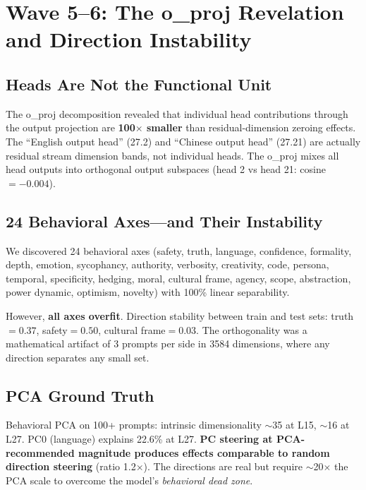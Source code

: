 \documentclass[11pt,a4paper]{article}
\begin{document}
\section{Wave 5--6: The o\_proj Revelation and Direction Instability}
\label{sec:oproj}

\subsection{Heads Are Not the Functional Unit}
The o\_proj decomposition revealed that individual head contributions through the output projection are \textbf{100$\times$ smaller} than residual-dimension zeroing effects. The ``English output head'' (27.2) and ``Chinese output head'' (27.21) are actually residual stream dimension bands, not individual heads. The o\_proj mixes all head outputs into orthogonal output subspaces (head 2 vs head 21: cosine $= -0.004$).

\subsection{24 Behavioral Axes---and Their Instability}
We discovered 24 behavioral axes (safety, truth, language, confidence, formality, depth, emotion, sycophancy, authority, verbosity, creativity, code, persona, temporal, specificity, hedging, moral, cultural frame, agency, scope, abstraction, power dynamic, optimism, novelty) with 100\% linear separability.

However, \textbf{all axes overfit}. Direction stability between train and test sets: truth$=0.37$, safety$=0.50$, cultural frame$=0.03$. The orthogonality was a mathematical artifact of 3 prompts per side in 3584 dimensions, where any direction separates any small set.

\subsection{PCA Ground Truth}
Behavioral PCA on 100+ prompts: intrinsic dimensionality $\sim$35 at L15, $\sim$16 at L27. PC0 (language) explains 22.6\% at L27. \textbf{PC steering at PCA-recommended magnitude produces effects comparable to random direction steering} (ratio 1.2$\times$). The directions are real but require $\sim$20$\times$ the PCA scale to overcome the model's \textit{behavioral dead zone}.

\end{document}
